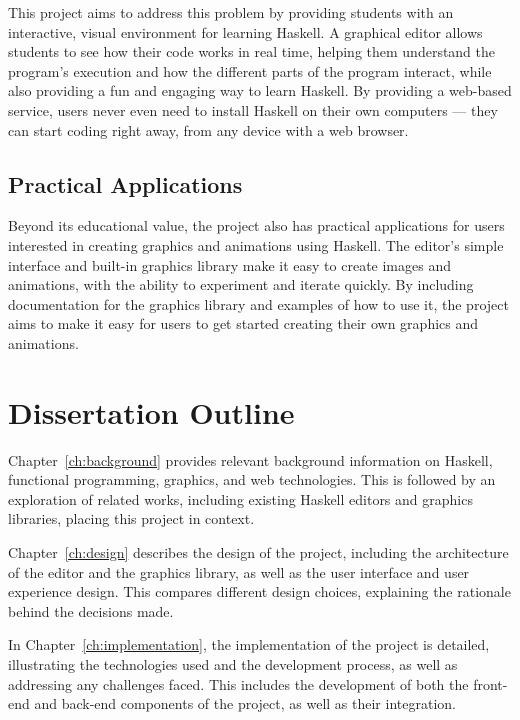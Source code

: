 \documentclass[../main.tex]{subfiles}
\begin{document}
            This project aims to address this problem by providing students with an
                interactive, visual environment for learning Haskell.
            A graphical editor allows students to see how their code works in real time,
                helping them understand the program's execution and how the different parts of
                the program interact, while also providing a fun and engaging way to learn
                Haskell.
            By providing a web-based service, users never even need to install Haskell on
                their own computers — they can start coding right away, from any device with a
                web browser.

        \subsection{Practical Applications}
            Beyond its educational value, the project also has practical applications for
                users interested in creating graphics and animations using Haskell.
            The editor's simple interface and built-in graphics library make it easy to
                create images and animations, with the ability to experiment and iterate
                quickly.
            By including documentation for the graphics library and examples of how to use
                it, the project aims to make it easy for users to get started creating their
                own graphics and animations.

    \section{Dissertation Outline}
        Chapter~\ref{ch:background} provides relevant background information on
            Haskell, functional programming, graphics, and web technologies.
        This is followed by an exploration of related works, including existing Haskell
            editors and graphics libraries, placing this project in context.

        Chapter~\ref{ch:design} describes the design of the project, including the
            architecture of the editor and the graphics library, as well as the user
            interface and user experience design.
        This compares different design choices, explaining the rationale behind the
            decisions made.

        In Chapter~\ref{ch:implementation}, the implementation of the project is
            detailed, illustrating the technologies used and the development process, as
            well as addressing any challenges faced.
        This includes the development of both the front-end and back-end components of
            the project, as well as their integration.
\end{document}

